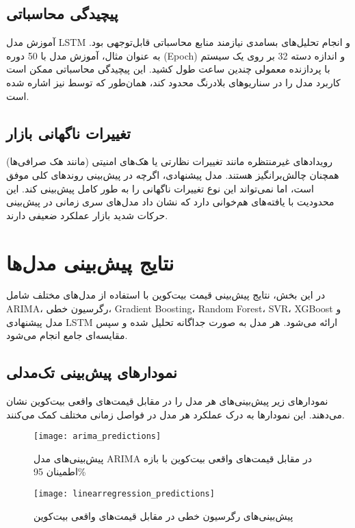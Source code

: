 \subsection{پیچیدگی محاسباتی}
آموزش مدل LSTM و انجام تحلیل‌های بسامدی نیازمند منابع محاسباتی قابل‌توجهی بود. به عنوان مثال، آموزش مدل با 50 دوره (Epoch) و اندازه دسته 32 بر روی یک سیستم با پردازنده معمولی چندین ساعت طول کشید. این پیچیدگی محاسباتی ممکن است کاربرد مدل را در سناریوهای بلادرنگ محدود کند، همان‌طور که توسط \cite{author1} نیز اشاره شده است.

\subsection{تغییرات ناگهانی بازار}
رویدادهای غیرمنتظره مانند تغییرات نظارتی یا هک‌های امنیتی (مانند هک صرافی‌ها) همچنان چالش‌برانگیز هستند. مدل پیشنهادی، اگرچه در پیش‌بینی روندهای کلی موفق است، اما نمی‌تواند این نوع تغییرات ناگهانی را به طور کامل پیش‌بینی کند. این محدودیت با یافته‌های \cite{lo1997market} هم‌خوانی دارد که نشان داد مدل‌های سری زمانی در پیش‌بینی حرکات شدید بازار عملکرد ضعیفی دارند.




\section{نتایج پیش‌بینی مدل‌ها}
در این بخش، نتایج پیش‌بینی قیمت بیت‌کوین با استفاده از مدل‌های مختلف شامل ARIMA، رگرسیون خطی، Gradient Boosting، Random Forest، SVR، XGBoost و مدل پیشنهادی LSTM ارائه می‌شود. هر مدل به صورت جداگانه تحلیل شده و سپس مقایسه‌ای جامع انجام می‌شود.

\subsection{نمودارهای پیش‌بینی تک‌مدلی}
نمودارهای زیر پیش‌بینی‌های هر مدل را در مقابل قیمت‌های واقعی بیت‌کوین نشان می‌دهند. این نمودارها به درک عملکرد هر مدل در فواصل زمانی مختلف کمک می‌کنند.

\begin{figure}[H]
	\centering
	\texttt{[image: arima\_predictions]}
	\caption{پیش‌بینی‌های مدل ARIMA در مقابل قیمت‌های واقعی بیت‌کوین با بازه اطمینان 95\%}
	\label{fig:arima_predictions}
\end{figure}

\begin{figure}[H]
	\centering
	\texttt{[image: linearregression\_predictions]}
	\caption{پیش‌بینی‌های رگرسیون خطی در مقابل قیمت‌های واقعی بیت‌کوین}
	\label{fig:linearregression_predictions}
\end{figure}


